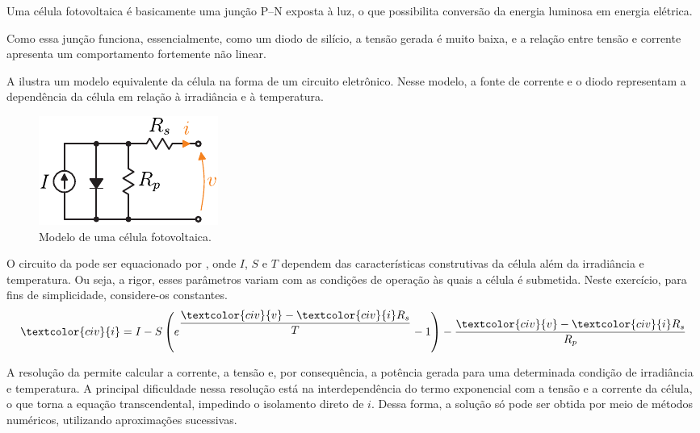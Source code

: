 Uma célula fotovoltaica é basicamente uma junção P–N exposta à luz, o que possibilita conversão da energia
luminosa em energia elétrica.

Como essa junção funciona, essencialmente, como um diodo de silício, a tensão gerada é muito baixa, e a relação entre
tensão e corrente apresenta um comportamento fortemente não linear.


A  ilustra um modelo equivalente da célula na forma de um circuito eletrônico.
Nesse modelo, a fonte de corrente e o diodo representam a dependência da célula em relação à irradiância e à temperatura.
\begin{figure}[htbp]
    \centering
    \includegraphics[scale=0.9]{figs/cell}
    \caption{Modelo de uma célula fotovoltaica.}
    \label{fig:cell}
\end{figure}

O circuito da  pode ser equacionado por , onde $I$, $S$ e $T$ dependem das
características construtivas da célula além da irradiância e temperatura.
Ou seja, a rigor, esses parâmetros variam com as condições de operação às quais a célula é submetida.
Neste exercício, para fins de simplicidade, considere-os constantes.
\begin{equation}
    \textcolor{civ}{i} = I - S \left(
    e^{\dfrac{\textcolor{civ}{v} -\textcolor{civ}{i}  R_s}{T}} - 1
    \right) - \dfrac{\textcolor{civ}{v} -\textcolor{civ}{i}  R_s}{R_p}
    \label{eq:cell}
\end{equation}

A resolução da  permite calcular a corrente, a tensão e, por consequência, a potência gerada para uma
determinada condição de irradiância e temperatura.
A principal dificuldade nessa resolução está na interdependência do termo exponencial com a tensão e a corrente da
célula, o que torna a equação transcendental, impedindo o isolamento direto de $i$.
Dessa forma, a solução só pode ser obtida por meio de métodos numéricos, utilizando aproximações sucessivas.

